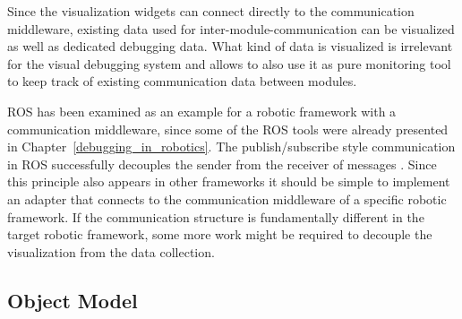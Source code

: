 

Since the visualization widgets can connect directly to the communication middleware, existing data used for inter-module-communication can be visualized as well as dedicated debugging data. What kind of data is visualized is irrelevant for the visual debugging system and allows to also use it as pure monitoring tool to keep track of existing communication data between modules.

ROS has been examined as an example for a robotic framework with a communication middleware, since some of the ROS tools were already presented in Chapter~\ref{debugging_in_robotics}. The publish/subscribe style communication in ROS successfully decouples the sender from the receiver of messages \cite{Eugster2003}. Since this principle also appears in other frameworks it should be simple to implement an adapter that connects to the communication middleware of a specific robotic framework. If the communication structure is fundamentally different in the target robotic framework, some more work might be required to decouple the visualization from the data collection.

\subsection{Object Model}
\label{object_model_section}

